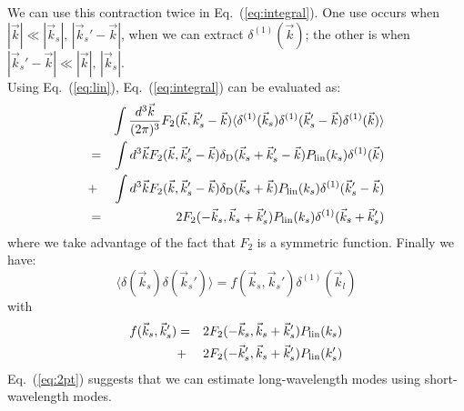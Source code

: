 \documentclass[prd,amsmath,amssymb,floatfix,superscriptaddress,nofootinbib,twocolumn]{revtex4-1}
\def\be{\begin{equation}}
\def\ee{\end{equation}}
\def\bea{\begin{eqnarray}}
\def\eea{\end{eqnarray}}
\newcommand{\vs}{\nonumber\\}
\newcommand{\vk}{\vec{k}}
\newcommand{\ec}[1]{Eq.~(\ref{eq:#1})}
\newcommand{\eql}[1]{\label{eq:#1}}
\begin{document}
We can use this contraction twice in \ec{integral}. One use occurs when $|\vk| \ll |\vk_s|,\, |\vk_s'-\vk|$, when we can extract ${\delta}^{(1)}(\vk)$; the other is when $|\vk_s'-\vk| \ll |\vk|,\,|\vk_s|$.\\
Using \ec{lin}, \ec{integral} can be evaluated as:
\bea 
&&\int \frac{d^3\vec{k}}{(2\pi)^3} F_2 (\vec{k},\vec{k}_s'-\vec{k})\langle {\delta}^{(1)}(\vec{k}_s){\delta}^{(1)}(\vec{k}_s'-\vec{k}){\delta}^{(1)}(\vec{k}) \rangle \vs
&=&\int d^3\vk F_2(\vec{k},\vec{k}_s'-\vec{k}) \delta_{\rm D}(\vk_s+\vk_s'-\vk)P_{\rm lin}(k_s){\delta}^{(1)}(\vec{k}) \vs
&+&\int d^3\vk F_2(\vec{k},\vec{k}_s'-\vec{k}) \delta_{\rm D}(\vk_s+\vk)P_{\rm lin}(k_s){\delta}^{(1)}(\vk_s'-\vk) \vs
&=&2F_2(-\vk_s,\vk_s+\vk_s')P_{\rm lin}(k_s){\delta}^{(1)}(\vk_s+\vk_s')
\eea 
where we take advantage of the fact that $F_2$ is a symmetric function. Finally we have:
\be 
\langle {\delta}(\vec{k}_s){\delta}(\vec{k}_s') \rangle =f(\vec{k}_s,\vec{k}_s'){\delta}^{(1)}(\vec{k}_l) \eql{2pt}
\ee 
with
\bea
f(\vec{k}_s,\vec{k}_s')&=&2F_2(-\vec{k}_s,\vec{k}_s+\vec{k}_s')P_{\rm lin}(k_s)\vs
&+&2F_2(-\vec{k}_s',\vec{k}_s+\vec{k}_s')P_{\rm lin}(k_s')       
\eea 
\ec{2pt} suggests that we can estimate long-wavelength modes using short-wavelength modes.
\end{document}
